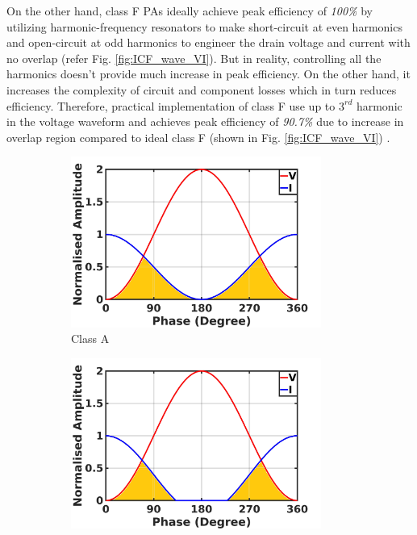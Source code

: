 \documentclass[conference]{IEEEtran}
\begin{document}
On the other hand, class F PAs ideally achieve peak efficiency of \textit{100\%} by utilizing harmonic-frequency resonators to make short-circuit at even harmonics and open-circuit at odd harmonics to engineer the drain voltage and current with no overlap (refer Fig. \ref{fig:ICF_wave_VI}). But in reality, controlling all the harmonics doesn't provide much increase in peak efficiency. On the other hand, it increases the complexity of circuit and component losses which in turn reduces efficiency. Therefore, practical implementation of class F use up to $3^{rd}$ harmonic in the voltage waveform and achieves peak efficiency of \textit{90.7\%} due to increase in overlap region compared to ideal class F (shown in Fig. \ref{fig:ICF_wave_VI}) \cite{Raab_max_eff}.
\begin{figure}[h]
\centering
\captionsetup{font=footnotesize}
\begin{subfigure}{0.24\textwidth}
\includegraphics[width=0.9\textwidth]{Images/Intro/ClassA_shaded.jpg}
\caption{Class A}
\label{fig:CA_wave_VI}
\end{subfigure}
\begin{subfigure}{0.24\textwidth}
\includegraphics[width=0.9\textwidth]{Images/Intro/ClassB_shaded.jpg}

\end{subfigure}
\end{figure}
\end{document}
